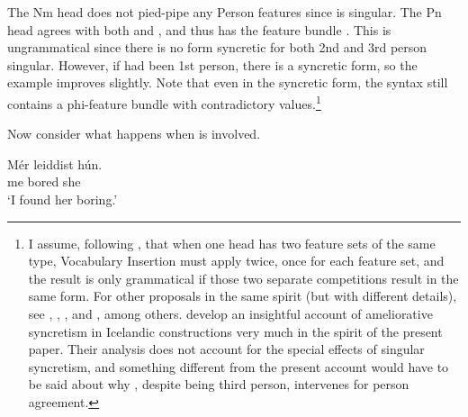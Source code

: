 \documentclass[output=paper,colorlinks,citecolor=brown,
]{langscibook}
\def\exattr#1{\hfill{} #1}
\begin{document}
The Nm head does not pied-pipe any Person features since  is singular. The Pn head agrees with both  and , and thus has the feature bundle . This is ungrammatical since there is no form syncretic for both 2nd and 3rd person singular. However, if  had been 1st person, there is a syncretic form, so the example improves slightly. Note that even in the syncretic form, the syntax still contains a phi-feature bundle with contradictory values.\footnote{I assume, following \cite{Bjorkman2016}, that when one head has two feature sets of the same type, Vocabulary Insertion must apply twice, once for each feature set, and the result is only grammatical if those two separate competitions result in the same form. For other proposals in the same spirit (but with different details), see \cite{citko2005nature}, \cite{Kratzer:2009jq}, \cite{bhatt2013locating}, \cite{Asarina2013} and  \cite{CoonKeine2020}, among others. \cite{CoonKeine2020} develop an insightful account of ameliorative syncretism in Icelandic  constructions very much in the spirit of the present paper. Their analysis  does not account for the special effects of singular \sti syncretism, and something different from the present account would have to be said about why \stin{}, despite being third person, intervenes for person agreement.  } 





Now consider what happens when \sti is involved. 


\ea 
    \ex
    {
        \gll Mér leiddist hún. \\
            me\dat{} bored she \\
        \glt `I found her boring.'
    }
    \exattr{\cite[16]{SigOnt}}%
    \z
\z
\end{document}

